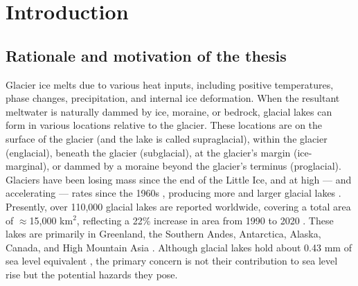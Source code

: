 \chapter{Introduction}
\label{ch:introduction}


\section{Rationale and motivation of the thesis}






Glacier ice melts due to various heat inputs, including positive temperatures, phase changes, precipitation, and internal ice deformation. When the resultant meltwater is naturally dammed by ice, moraine, or bedrock, glacial lakes can form in various locations relative to the glacier. These locations are on the surface of the glacier (and the lake is called supraglacial), within the glacier (englacial), beneath the glacier (subglacial), at the glacier's margin (ice-marginal), or dammed by a moraine beyond the glacier's terminus (proglacial). Glaciers have been losing mass since the end of the Little Ice, and at high — and accelerating — rates since the 1960s \cite{Huggonet2022,Zemp2019}, producing more and larger glacial lakes \cite{Zhang&al2024}. Presently, over 110,000 glacial lakes are reported worldwide, covering a total area of  $\approx$15,000 km$^2$, reflecting a 22\% increase in area from 1990 to 2020 \citep{Zhang&al2024}. These lakes are primarily in Greenland, the Southern Andes, Antarctica, Alaska, Canada, and High Mountain Asia \citep{Shugar&al2020}. Although glacial lakes hold about 0.43 mm of sea level equivalent \cite{Shugar&al2020}, the primary concern is not their contribution to sea level rise but the potential hazards they pose.

